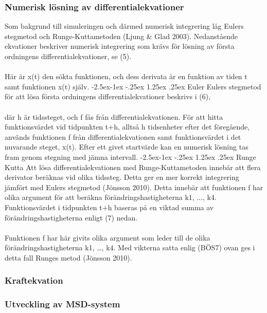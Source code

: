 \documentclass[a4paper,12pt,oneside,final,swedish]{extarticle}
\makeatletter
\renewcommand\paragraph{\@startsection{paragraph}{4}{\z@}%
            {-2.5ex\@plus -1ex \@minus -.25ex}%
            {1.25ex \@plus .25ex}%
            {\normalfont\normalsize\bfseries}}
\makeatother
\begin{document}
\subsubsection{Numerisk lösning av differentialekvationer}
Som bakgrund till simuleringen och därmed numerisk integrering låg Eulers stegmetod och Runge-Kuttametoden (Ljung \& Glad 2003). Nedanstående ekvationer beskriver numerisk integrering som krävs för lösning av första ordningens differentialekvationer, se (5).
\\\\Här är x(t) den sökta funktionen, och dess derivata är en funktion av tiden t samt funktionen x(t) själv.
\paragraph{Euler}%
Eulers stegmetod för att lösa första ordningens differentialekvationer beskrivs i (6),
\\\\där h är tidssteget, och f fås från differentialekvationen. För att hitta funktionsvärdet vid tidpunkten t+h, alltså h tidsenheter efter det föregående, används funktionen f från differentialekvationen samt funktionsvärdet i det nuvarande steget, x(t). Efter ett givet startvärde kan en numerisk lösning tas fram genom stegning med jämna intervall.
\paragraph{Runge Kutta}%
Att lösa differentialekvationen med Runge-Kuttametoden innebär att flera derivator beräknas vid olika tidssteg. Detta ger en mer korrekt integrering jämfört med Eulers stegmetod (Jönsson 2010). Detta innebär att funktionen f har olika argument för att beräkna förändringshastigheterna k1, ..., k4. Funktionsvärdet i tidpunkten t+h baseras på en viktad summa av förändringshastigheterna enligt (7) nedan.
\\\\Funktionen f har här givits olika argument som leder till de olika förändringshastigheterna k1, …, k4. Med vikterna satta enlig (BÖS7) ovan ges i detta fall Runges metod (Jönsson 2010).
\subsubsection{Kraftekvation}
\subsubsection{Utveckling av MSD-system}
\end{document}
